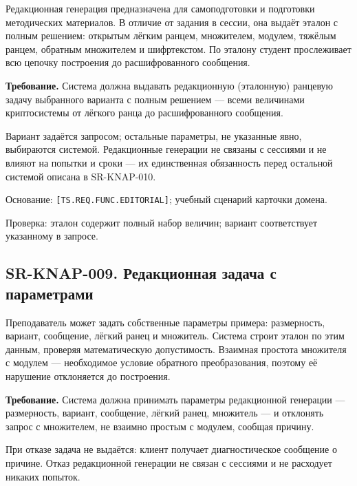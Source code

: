 \documentclass[12pt,a4paper]{article}
\begin{document}
\hypertarget{sr-knap-008-редакционная-задача-по-варианту}{}

Редакционная генерация предназначена для самоподготовки и подготовки методических материалов. В отличие от задания в сессии, она выдаёт эталон с полным решением: открытым лёгким ранцем, множителем, модулем, тяжёлым ранцем, обратным множителем и шифртекстом. По эталону студент прослеживает всю цепочку построения до расшифрованного сообщения.

\textbf{Требование.} Система должна выдавать редакционную (эталонную) ранцевую задачу выбранного варианта с полным решением --- всеми величинами криптосистемы от лёгкого ранца до расшифрованного сообщения.

Вариант задаётся запросом; остальные параметры, не указанные явно, выбираются системой. Редакционные генерации не связаны с сессиями и не влияют на попытки и сроки --- их единственная обязанность перед остальной системой описана в SR-KNAP-010.

Основание: \texttt{[TS.\allowbreak{}REQ.\allowbreak{}FUNC.\allowbreak{}EDITORIAL]}; учебный сценарий карточки домена.

Проверка: эталон содержит полный набор величин; вариант соответствует указанному в запросе.

\subsection{SR-KNAP-009. Редакционная задача с параметрами}\label{sr-knap-009-ux440ux435ux434ux430ux43aux446ux438ux43eux43dux43dux430ux44f-ux437ux430ux434ux430ux447ux430-ux441-ux43fux430ux440ux430ux43cux435ux442ux440ux430ux43cux438}

\hypertarget{sr-knap-009-редакционная-задача-с-параметрами}{}

Преподаватель может задать собственные параметры примера: размерность, вариант, сообщение, лёгкий ранец и множитель. Система строит эталон по этим данным, проверяя математическую допустимость. Взаимная простота множителя с модулем --- необходимое условие обратного преобразования, поэтому её нарушение отклоняется до построения.

\textbf{Требование.} Система должна принимать параметры редакционной генерации --- размерность, вариант, сообщение, лёгкий ранец, множитель --- и отклонять запрос с множителем, не взаимно простым с модулем, сообщая причину.

При отказе задача не выдаётся: клиент получает диагностическое сообщение о причине. Отказ редакционной генерации не связан с сессиями и не расходует никаких попыток.
\end{document}
